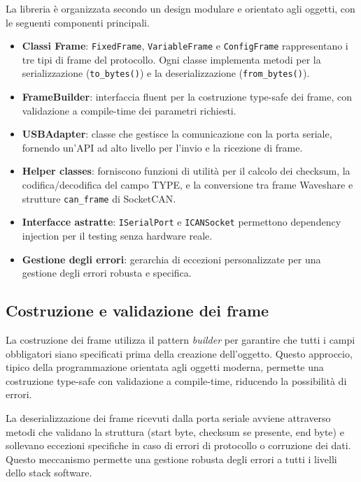 La libreria è organizzata secondo un design modulare e orientato agli oggetti, con le seguenti componenti principali.

\begin{itemize}
    \item \textbf{Classi Frame}: \texttt{FixedFrame}, \texttt{VariableFrame} e \texttt{ConfigFrame} rappresentano i tre tipi di frame del protocollo. Ogni classe implementa metodi per la serializzazione (\texttt{to\_bytes()}) e la deserializzazione (\texttt{from\_bytes()}).
    \item \textbf{FrameBuilder}: interfaccia fluent per la costruzione type-safe dei frame, con validazione a compile-time dei parametri richiesti.
    \item \textbf{USBAdapter}: classe che gestisce la comunicazione con la porta seriale, fornendo un'API ad alto livello per l'invio e la ricezione di frame.
    \item \textbf{Helper classes}: forniscono funzioni di utilità per il calcolo dei checksum, la codifica/decodifica del campo TYPE, e la conversione tra frame Waveshare e strutture \texttt{can\_frame} di SocketCAN.
    \item \textbf{Interfacce astratte}: \texttt{ISerialPort} e \texttt{ICANSocket} permettono dependency injection per il testing senza hardware reale.
    \item \textbf{Gestione degli errori}: gerarchia di eccezioni personalizzate per una gestione degli errori robusta e specifica.
\end{itemize}

\subsection{Costruzione e validazione dei frame}

La costruzione dei frame utilizza il pattern \textit{builder} per garantire che tutti i campi obbligatori siano specificati prima della creazione dell'oggetto. Questo approccio, tipico della programmazione orientata agli oggetti moderna, permette una costruzione type-safe con validazione a compile-time, riducendo la possibilità di errori.

La deserializzazione dei frame ricevuti dalla porta seriale avviene attraverso metodi che validano la struttura (start byte, checksum se presente, end byte) e sollevano eccezioni specifiche in caso di errori di protocollo o corruzione dei dati. Questo meccanismo permette una gestione robusta degli errori a tutti i livelli dello stack software.

